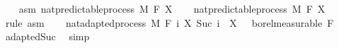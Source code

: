 \begin{isabellebody}
\isanewline
\ \ \isamarkupfalse%
\ asm{\isacharcolon}{\kern0pt}\ {\isachardoublequoteopen}nat{\isacharunderscore}{\kern0pt}predictable{\isacharunderscore}{\kern0pt}process\ M\ F\ X{\isachardoublequoteclose}\isanewline
\ \ \isamarkupfalse%
\ nat{\isacharunderscore}{\kern0pt}predictable{\isacharunderscore}{\kern0pt}process\ M\ F\ X\ \isamarkupfalse%
\ {\isacharparenleft}{\kern0pt}rule\ asm{\isacharparenright}{\kern0pt}\isanewline
\ \ \isamarkupfalse%
\ {\isachardoublequoteopen}nat{\isacharunderscore}{\kern0pt}adapted{\isacharunderscore}{\kern0pt}process\ M\ F\ {\isacharparenleft}{\kern0pt}{\isasymlambda}i{\isachardot}{\kern0pt}\ X\ {\isacharparenleft}{\kern0pt}Suc\ i{\isacharparenright}{\kern0pt}{\isacharparenright}{\kern0pt}\ {\isasymand}\ X\ {}\ {\isasymin}\ borel{\isacharunderscore}{\kern0pt}measurable\ {\isacharparenleft}{\kern0pt}F\ {}{\isacharparenright}{\kern0pt}{\isachardoublequoteclose}\ \isamarkupfalse%
\ adapted{\isacharunderscore}{\kern0pt}Suc\ \isamarkupfalse%
\ simp\isanewline
{}\isamarkupfalse%
%
\endisatagproof
{\isafoldproof}%
%
\isadelimproof
\isanewline
%
\endisadelimproof
%
\isadelimtheory
\ \ \ \ \ \ \ \ \ \ \ \ \ \ \ \ \ \ \ \ \ \ \ \ \ \ \ \ \ \ \ \ \ \ \ \ \ \ \ \ \ \ \ \ \ \ \ \ \ \ \ \ \ \ \ \ \ \ \ \ \ \ \ \ \ \ \ \ \ \ \ \ \ \ \ \ \isanewline
%
\endisadelimtheory
%
\isatagtheory
{}\isamarkupfalse%
%
\endisatagtheory
{\isafoldtheory}%
%
\isadelimtheory
%
\endisadelimtheory
%
\end{isabellebody}%
\endinput
